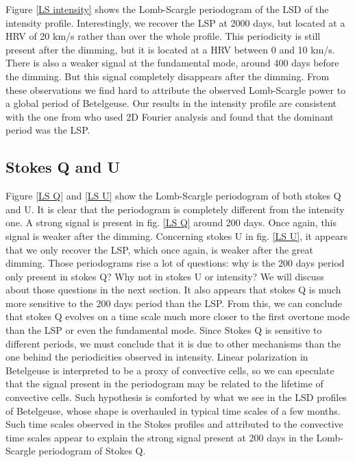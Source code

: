 \documentclass{aa}
\begin{document}
Figure \ref{LS intensity} shows the Lomb-Scargle periodogram of the LSD of the intensity profile. Interestingly, we recover the LSP at 2000 days, 
but located at a HRV of 20 km/s rather than over the whole profile. This periodicity is still present after the  dimming, but  it is located at a HRV between 0 and 10 km/s. 
There is also a weaker signal at the fundamental mode, around 400 days before the dimming. But this signal completely disappears after the dimming. From these observations
we find  hard to attribute 
the observed Lomb-Scargle power to a global period of Betelgeuse.
Our results 
in the intensity profile are consistent with the one from \cite{mathias_evolution_2018} who used 2D Fourier analysis and found that the dominant period was the LSP. 


\subsection{Stokes Q and U}

Figure \ref{LS Q} and \ref{LS U} show the Lomb-Scargle periodogram of both stokes Q and U. It is clear that the periodogram is completely different 
from the intensity one. A strong signal is present in fig. \ref{LS Q} around 200 days. Once again, this signal is weaker after the dimming.
Concerning stokes U in fig. \ref{LS U}, it appears that we only recover the LSP, which once again, is weaker after the great dimming. 
Those periodograms rise a lot of questions: why is the 200 days period only present in stokes Q? Why not in stokes U or intensity? 
We will discuss about those questions in the next section. It also appears that stokes Q is
much more sensitive to the 200 days period than the LSP. From this, we can conclude that stokes
Q evolves on a time scale much more closer to the first overtone 
mode than the LSP or even the fundamental mode. Since Stokes Q is sensitive to different periods, we must conclude that it is due to other mechanisms
than the one behind the periodicities observed in intensity. Linear polarization in Betelgeuse is interpreted to be a proxy of  convective cells,
so we can speculate that the signal present in the periodogram 
may be related to  the lifetime of convective cells. Such hypothesis is comforted by what we see in the 
LSD profiles of  Betelgeuse, whose shape is overhauled  in typical time scales of  a few months.
Such time scales observed in the Stokes profiles and attributed to the convective time scales 
appear to explain the strong signal present at 200 days in the Lomb-Scargle periodogram of Stokes Q. 
\end{document}
